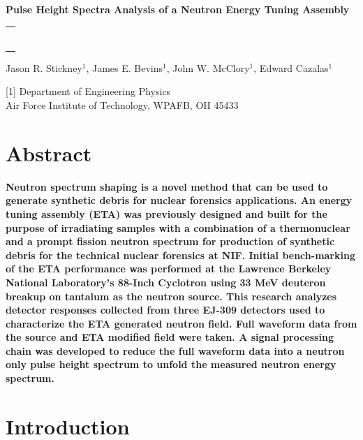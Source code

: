 \documentclass[twocolumn,10pt,final]{asme2ej}
\begin{document}
\begin{center}

\textbf{\large{Pulse Height Spectra Analysis of a Neutron Energy Tuning Assembly}}

\noindent
\begin{tabular}{l}
\rule{3.2in}{0.02in}
\end{tabular}

{Jason R. Stickney$^1$, James E. Bevins$^1$, John W. McClory$^1$, Edward Cazalas$^1$}
\vspace{0.1in}

{[1] Department of Engineering Physics\\
	Air Force Institute of Technology,	WPAFB, OH 45433\\}

\end{center}

\vspace{-0.5 cm}
\section*{Abstract}
\textbf{
Neutron spectrum shaping is a novel method that can be used to generate synthetic debris for nuclear forensics applications.  
An energy tuning assembly (ETA) was previously designed and built for the purpose of irradiating samples with a combination of a thermonuclear and a prompt fission neutron spectrum for production of synthetic debris for the technical nuclear forensics at NIF. 
Initial bench-marking of the ETA performance was performed at the Lawrence Berkeley National Laboratory’s 88-Inch Cyclotron using 33 MeV deuteron breakup on tantalum as the neutron source.  
This research analyzes detector responses collected from three EJ-309 detectors used to characterize the ETA generated neutron field.   
Full waveform data from the source and ETA modified field were taken.  
A signal processing chain was developed to reduce the full waveform data into a neutron only pulse height spectrum to unfold the measured neutron energy spectrum.}


\vspace{-0.4 cm}
\section{Introduction} \label{intro}
\end{document}
